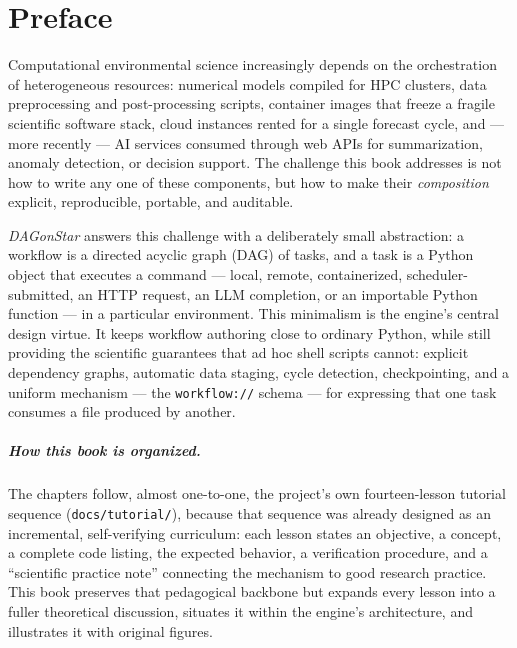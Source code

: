 \chapter*{Preface}

Computational environmental science increasingly depends on the orchestration
of heterogeneous resources: numerical models compiled for HPC clusters, data
preprocessing and post-processing scripts, container images that freeze a
fragile scientific software stack, cloud instances rented for a single
forecast cycle, and --- more recently --- AI services consumed through web
APIs for summarization, anomaly detection, or decision support. The challenge
this book addresses is not how to write any one of these components, but how
to make their \emph{composition} explicit, reproducible, portable, and
auditable.

\emph{DAGonStar} answers this challenge with a deliberately small abstraction:
a workflow is a directed acyclic graph (DAG) of tasks, and a task is a Python
object that executes a command --- local, remote, containerized,
scheduler-submitted, an HTTP request, an LLM completion, or an importable
Python function --- in a particular environment. This minimalism is the
engine's central design virtue. It keeps workflow authoring close to ordinary
Python, while still providing the scientific guarantees that ad hoc shell
scripts cannot: explicit dependency graphs, automatic data staging, cycle
detection, checkpointing, and a uniform mechanism --- the \texttt{workflow://}
schema --- for expressing that one task consumes a file produced by another.

\paragraph{How this book is organized.}
The chapters follow, almost one-to-one, the project's own fourteen-lesson
tutorial sequence (\texttt{docs/tutorial/}), because that sequence was already
designed as an incremental, self-verifying curriculum: each lesson states an
objective, a concept, a complete code listing, the expected behavior, a
verification procedure, and a ``scientific practice note'' connecting the
mechanism to good research practice. This book preserves that pedagogical
backbone but expands every lesson into a fuller theoretical discussion,
situates it within the engine's architecture, and illustrates it with
original figures.

